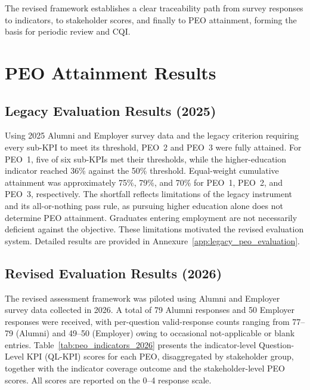 The revised framework establishes a clear traceability path from survey responses to indicators, to stakeholder scores, and finally to PEO attainment, forming the basis for periodic review and CQI.

\hypertarget{attainment-results}{%
\section{PEO Attainment Results}\label{attainment-results}}

\subsection{Legacy Evaluation Results (2025)}

Using 2025 Alumni and Employer survey data and the legacy criterion requiring every sub-KPI to meet its threshold, PEO~2 and PEO~3 were fully attained. For PEO~1, five of six sub-KPIs met their thresholds, while the higher-education indicator reached 36\% against the 50\% threshold. Equal-weight cumulative attainment was approximately 75\%, 79\%, and 70\% for PEO~1, PEO~2, and PEO~3, respectively. The shortfall reflects limitations of the legacy instrument and its all-or-nothing pass rule, as pursuing higher education alone does not determine PEO attainment. Graduates entering employment are not necessarily deficient against the objective. These limitations motivated the revised evaluation system. Detailed results are provided in Annexure~\ref{app:legacy_peo_evaluation}.

\subsection{Revised Evaluation Results (2026)}

The revised assessment framework was piloted using Alumni and Employer survey data collected in 2026. A total of 79 Alumni responses and 50 Employer responses were received, with per-question valid-response counts ranging from 77--79 (Alumni) and 49--50 (Employer) owing to occasional not-applicable or blank entries. Table~\ref{tab:peo_indicators_2026} presents the indicator-level Question-Level KPI (QL-KPI) scores for each PEO, disaggregated by stakeholder group, together with the indicator coverage outcome and the stakeholder-level PEO scores. All scores are reported on the 0--4 response scale.


